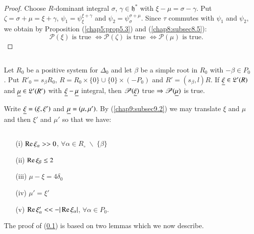 \begin{proof}
Choose $R$-dominant integral $\sigma$, $\gamma \in \mathfrak{h}^*$
with $\xi - \mu = \sigma-\gamma$. Put $\zeta = \sigma + \mu = \xi +
\gamma$, $\psi_1 = \psi^{\xi + \gamma}_\xi$ and $\psi_2 =
\psi^{\sigma+ \mu}_\sigma$. Since $\tau$ commutes with $\psi_1$ and
$\psi_2$, we obtain by Proposition (\ref{chap5:prop5.3}) and
(\ref{chap8:subsec8.5}): 
$$
\mathscr{P}(\xi) \text{ is true } \Leftrightarrow \mathscr{P}(\zeta)
\text{ is true } \Leftrightarrow \mathscr{P} (\mu)\text{ is true. }
$$\pageoriginale
\end{proof}

\subsection{}\label{chap9:subsec9.3}
Let $R_0$ be a positive system for $\Delta_0$ and let $\beta$ be a
simple root in $R_0$ with $-\beta \in P_0$. Put $R'_0 = s_\beta R_0$,
$R= R_0 \times \{0\} \cup \{0\} \times (-P_0)$ and $R' = (s_\beta, l)
R$. If $\underline{\xi} \in \mathfrak{L}'(R)$ and $\underline{\mu} \in \mathfrak{L}'
(R')$ with $\underline{\xi} - \underline{\mu}$ integral, then $\mathscr{P}(\underline{\xi})$
true $\Rightarrow \mathscr{P}(\underline{\mu})$ is true. 


Write $\underline{\xi} = (\xi, \xi')$ and $\underline{\mu} = (\mu, \mu')$. By
(\ref{chap9:subsec9.2}) we may translate $\xi$ and $\mu$ and then
$\xi'$ and $\mu'$ so that we have: 

\subsection{}\label{chap9:subsec9.4}
\begin{itemize}
\item[{\rm (i)}] $\operatorname{Re} \xi_\alpha >> 0$, \quad $\forall \alpha \in R_\circ \; 
 \backslash \;  \{ \beta\}$

\item[{\rm (ii)}] $\operatorname{Re} \xi_{\beta} \leq 2$

\item[{\rm (iii)}] $\mu - \xi = 4 \delta_0$

\item[{\rm (iv)}] $\mu' = \xi' $

\item[{\rm (v)}] $\operatorname{Re} \xi'_\alpha << -|\operatorname{Re} \xi_\alpha|$, \quad
  $\forall \alpha \in P_0$. 
\end{itemize}

The proof of (\ref{chap9:subsec9.3}) is based on two lemmas which we now describe.

